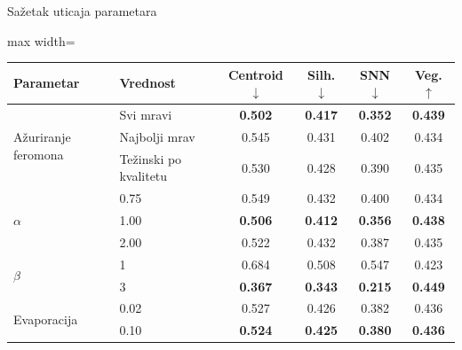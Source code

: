 \documentclass[aspectratio=169,10pt]{beamer}
\newcommand{\betterdown}{\(\downarrow\)}
\newcommand{\betterup}{\(\uparrow\)}
\begin{document}
\begin{frame}{Sažetak uticaja parametara}
  \begin{adjustbox}{max width=\textwidth}
  \begin{tabular}{llcccc}
    \toprule
    Parametar & Vrednost & Centroid \betterdown & Silh. \betterdown & SNN \betterdown & Veg. \betterup \\
    \midrule
    \multirow{3}{*}{Ažuriranje feromona}
      & Svi mravi & \textbf{0.502} & \textbf{0.417} & \textbf{0.352} & \textbf{0.439} \\
      & Najbolji mrav & 0.545 & 0.431 & 0.402 & 0.434 \\
      & Težinski po kvalitetu & 0.530 & 0.428 & 0.390 & 0.435 \\
    \midrule
    \multirow{3}{*}{\(\alpha\)}
      & 0.75 & 0.549 & 0.432 & 0.400 & 0.434 \\
      & 1.00 & \textbf{0.506} & \textbf{0.412} & \textbf{0.356} & \textbf{0.438} \\
      & 2.00 & 0.522 & 0.432 & 0.387 & 0.435 \\
    \midrule
    \multirow{2}{*}{\(\beta\)}
      & 1 & 0.684 & 0.508 & 0.547 & 0.423 \\
      & 3 & \textbf{0.367} & \textbf{0.343} & \textbf{0.215} & \textbf{0.449} \\
    \midrule
    \multirow{2}{*}{Evaporacija}
      & 0.02 & 0.527 & 0.426 & 0.382 & 0.436 \\
      & 0.10 & \textbf{0.524} & \textbf{0.425} & \textbf{0.380} & \textbf{0.436} \\
    \bottomrule
  \end{tabular}
  \end{adjustbox}
\end{frame}
\end{document}
